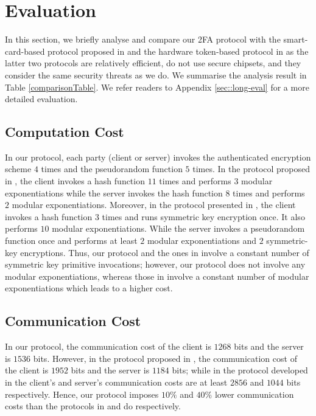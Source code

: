 
\section{Evaluation}\label{sec::eval}

In this section, we briefly analyse and compare our 2FA protocol with the smart-card-based protocol proposed in  \cite{WangW18} and the hardware token-based protocol in \cite{JareckiJKSS21} as the latter two protocols are relatively efficient, do not use secure chipsets, and they consider the same security threats as we do. We summarise the analysis result in Table \ref{comparisonTable}. We refer readers to Appendix \ref{sec::long-eval} for a more detailed evaluation. 







\subsection{Computation Cost}

In our protocol, each party (client or server) invokes the authenticated encryption scheme $4$ times and the pseudorandom function $5$ times. In the protocol proposed in \cite{WangW18}, the client invokes a hash function $11$ times and performs $3$ modular exponentiations while the server invokes the hash function $8$ times and performs $2$ modular exponentiations. Moreover, in the protocol presented in \cite{JareckiJKSS21}, the client invokes a hash function $3$ times and runs symmetric key encryption once. It also performs $10$ modular exponentiations. While the server invokes a pseudorandom function once and performs at least $2$ modular exponentiations and $2$ symmetric-key encryptions. Thus,  our protocol and the ones in \cite{WangW18,JareckiJKSS21} involve a constant number of symmetric key primitive invocations; however, our protocol does not involve any modular exponentiations, whereas those in  \cite{WangW18,JareckiJKSS21} involve a constant number of modular exponentiations which leads to a higher cost. 

\subsection{Communication Cost}

In our protocol, the communication cost of the client is $1268$ bits and the server is $1536$ bits. However, in the protocol proposed in \cite{WangW18},  the communication cost of the client is $1952$ bits and the server is  $1184$ bits; while in the protocol developed in \cite{JareckiJKSS21} the client's and server's communication costs are at least $2856$ and $1044$ bits respectively. Hence, our protocol imposes $10\%$ and $40\%$ lower communication costs than the protocols in \cite{WangW18} and \cite{JareckiJKSS21} do respectively.


